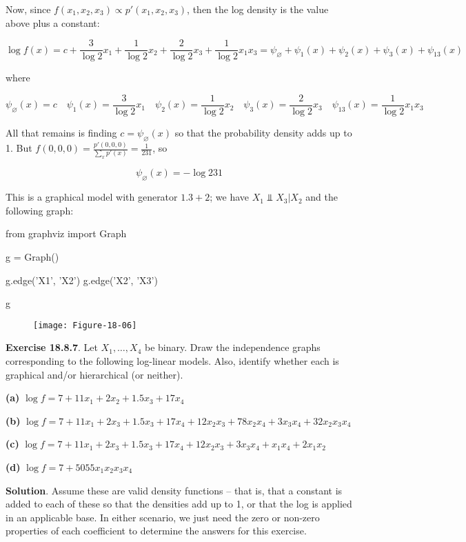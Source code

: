 Now, since \(f(x_{1}, x_{2}, x_{3}) \propto p'(x_{1}, x_{2}, x_{3})\), then the log
density is the value above plus a constant:

\[ \log f(x) = c + \frac{3}{\log 2} x_{1} + \frac{1}{\log 2} x_{2} + \frac{2}{\log 2} x_{3} + \frac{1}{\log 2} x_{1} x_{3}  = \psi_\varnothing + \psi_{1}(x) + \psi_{2}(x) + \psi_{3}(x) + \psi_{13}(x)\]

where

\[ \psi_\varnothing(x) = c
\quad
\psi_{1}(x) = \frac{3}{\log 2} x_{1}
\quad
\psi_{2}(x) = \frac{1}{\log 2} x_{2}
\quad
\psi_{3}(x) = \frac{2}{\log 2} x_{3}
\quad
\psi_{13}(x) = \frac{1}{\log 2} x_{1} x_{3}
\]

All that remains is finding \(c = \psi_\varnothing(x)\) so that the
probability density adds up to 1. But
\(f(0, 0, 0) = \frac{p'(0, 0, 0)}{\sum_x p'(x)} = \frac{1}{231}\), so

\[ \psi_\varnothing(x) = - \log 231\]

This is a graphical model with generator \(1.3 + 2\); we have
\(X_{1} \text{ ⫫ } X_{3} | X_{2}\) and the following graph:

\begin{python}
from graphviz import Graph

g = Graph()

g.edge('X1', 'X2')
g.edge('X2', 'X3')

g
\end{python}
 
\begin{figure}[H]
\centering
\texttt{[image: Figure-18-06]}
\end{figure}

\textbf{Exercise 18.8.7}. Let \(X_{1}, \dots, X_{4}\) be binary. Draw the
independence graphs corresponding to the following log-linear models.
Also, identify whether each is graphical and/or hierarchical (or
neither).

\textbf{(a)} \(\log f = 7 + 11 x_{1} + 2 x_{2} + 1.5 x_{3} + 17 x_{4}\)

\textbf{(b)}
\(\log f = 7 + 11 x_{1} + 2 x_{3} + 1.5 x_{3} + 17 x_{4} + 12 x_{2} x_{3} + 78 x_{2} x_{4} + 3 x_{3} x_{4} + 32 x_{2} x_{3} x_{4}\)

\textbf{(c)}
\(\log f = 7 + 11 x_{1} + 2 x_{3} + 1.5 x_{3} + 17 x_{4} + 12 x_{2} x_{3} + 3 x_{3} x_{4} + x_{1} x_{4} + 2 x_{1} x_{2}\)

\textbf{(d)} \(\log f = 7 + 5055 x_{1} x_{2} x_{3} x_{4}\)

\textbf{Solution}. Assume these are valid density functions --
that is, that a constant is added to each of these so that the densities
add up to 1, or that the log is applied in an applicable base. In either
scenario, we just need the zero or non-zero properties of each
coefficient to determine the answers for this exercise.

